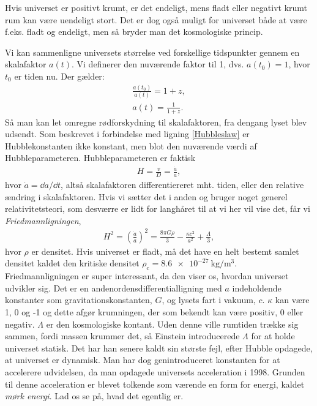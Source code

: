 Hvis universet er positivt krumt, er det endeligt, mens fladt eller negativt krumt rum kan være uendeligt stort. Det er dog også muligt for universet både at være f.eks. fladt og endeligt, men så bryder man det kosmologiske princip.

Vi kan sammenligne universets størrelse ved forskellige tidspunkter gennem en skalafaktor $a(t)$. Vi definerer den nuværende faktor til 1, dvs. $a(t_\text{0})=1$, hvor $t_0$ er tiden nu. Der gælder:
\begin{align}
\frac{a(t_0)}{a(t)}=1+z, \\
a(t)=\frac{1}{1+z}.
\end{align}
Så man kan let omregne rødforskydning til skalafaktoren, fra dengang lyset blev udsendt.
%
Som beskrevet %
i forbindelse med ligning \eqref{Hubbleslaw} er Hubblekonstanten ikke konstant, men blot den nuværende værdi af Hubbleparameteren. Hubbleparameteren er faktisk
\begin{align}
H=\frac{v}{D}=\frac{\dot{a}}{a},
\end{align}
hvor $\dot{a} = \dd{a}/\dd{t}$, altså skalafaktoren differentiereret mht. tiden, eller den relative ændring i skalafaktoren. Hvis vi sætter det i anden og bruger noget generel relativitetsteori, som desværre er lidt for langhåret til at vi her vil vise det, får vi \emph{Friedmannligningen},
\begin{align}
H^2=\left(\frac{\dot{a}}{a}\right)^2=\frac{8\pi G \rho}{3}-\frac{\kappa c^2}{a^2}+\frac{\Lambda}{3}, \label{friedmann}
\end{align}
hvor $\rho$ er densitet. Hvis universet er fladt, må det have en helt bestemt samlet densitet kaldet den kritiske densitet $\rho_\text{c} = \SI{8.6e-27}{\kilo\gram\per\cubic\metre}$. Friedmannligningen er super interessant, da den viser os, hvordan universet udvikler sig. Det er en andenordensdifferentialligning med $a$ indeholdende konstanter som gravitationskonstanten, $G$, og lysets fart i vakuum, $c$. $\kappa$ kan være 1, 0 og -1 og dette afgør krumningen, der som bekendt kan være positiv, 0 eller negativ. $\Lambda$ er den kosmologiske kontant. Uden denne ville rumtiden trække sig sammen, fordi massen krummer det, så Einstein introducerede $\Lambda$ for at holde universet statisk. Det har han senere kaldt sin største fejl, efter Hubble opdagede, at universet er dynamisk. Man har dog genintroduceret konstanten for at accelerere udvidelsen, da man opdagede universets acceleration i 1998. Grunden til denne acceleration er blevet tolkende som værende en form for energi, kaldet \emph{mørk energi}. Lad os se på, hvad det egentlig er.

